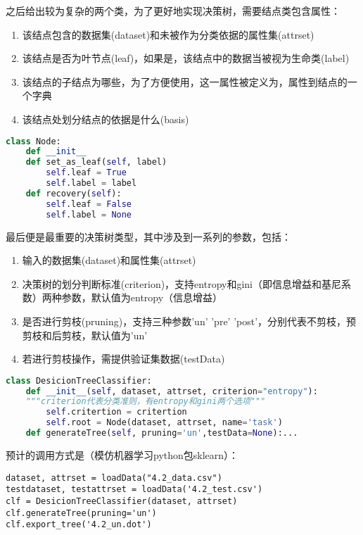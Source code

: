 \documentclass[UTF8]{ctexart}
\begin{document}
之后给出较为复杂的两个类，为了更好地实现决策树，需要结点类包含属性：
\begin{enumerate}[i]
	\item 该结点包含的数据集(dataset)和未被作为分类依据的属性集(attrset)
	\item 该结点是否为叶节点(leaf)，如果是，该结点中的数据当被视为生命类(label)
	\item 该结点的子结点为哪些，为了方便使用，这一属性被定义为，属性到结点的一个字典
	\item 该结点处划分结点的依据是什么(basis)
\end{enumerate}
\begin{lstlisting}[language=python]
class Node:
	def __init__
	def set_as_leaf(self, label)
		self.leaf = True
		self.label = label
	def recovery(self):
		self.leaf = False
		self.label = None
\end{lstlisting}

最后便是最重要的决策树类型，其中涉及到一系列的参数，包括：
\begin{enumerate}
	\item 输入的数据集(dataset)和属性集(attrset)
	\item 决策树的划分判断标准(criterion)，支持entropy和gini（即信息增益和基尼系数）两种参数，默认值为entropy（信息增益）
	\item 是否进行剪枝(pruning)，支持三种参数'un' 'pre' 'post'，分别代表不剪枝，预剪枝和后剪枝，默认值为'un'
	\item 若进行剪枝操作，需提供验证集数据(testData)
\end{enumerate}

\begin{lstlisting}[language=python]
class DesicionTreeClassifier:
	def __init__(self, dataset, attrset, criterion="entropy"):
	"""criterion代表分类准则，有entropy和gini两个选项"""
		self.critertion = critertion
		self.root = Node(dataset, attrset, name='task')
	def generateTree(self, pruning='un',testData=None):...
\end{lstlisting}

预计的调用方式是（模仿机器学习python包sklearn）：
\begin{lstlisting}
dataset, attrset = loadData("4.2_data.csv")
testdataset, testattrset = loadData('4.2_test.csv')
clf = DesicionTreeClassifier(dataset, attrset)
clf.generateTree(pruning='un')
clf.export_tree('4.2_un.dot')
\end{lstlisting}
\end{document}
